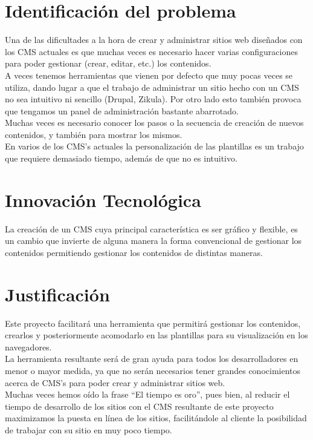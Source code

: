 \section{Identificaci\'on del problema}
Una de las dificultades a la hora de crear y administrar sitios web dise\~nados con los CMS actuales es que muchas veces es necesario hacer varias configuraciones para poder gestionar (crear, editar, etc.) los contenidos.\\
A veces tenemos herramientas que vienen por defecto que muy pocas veces se utiliza, dando lugar a que el trabajo de administrar un sitio hecho con un CMS no sea intuitivo ni sencillo (Drupal, Zikula). Por otro lado esto tambi\'en provoca que tengamos un panel de administraci\'on bastante abarrotado.\\
Muchas veces es necesario conocer los pasos o la secuencia de creaci\'on de nuevos contenidos, y tambi\'en para mostrar los mismos.\\
En varios de los CMS's actuales la personalizaci\'on de las plantillas es un trabajo que requiere demasiado tiempo, adem\'as de que no es intuitivo.\\

\section{Innovaci\'on Tecnol\'ogica}
La creaci\'on de un CMS cuya principal caracter\'istica es ser gr\'afico y flexible, es un cambio que invierte de alguna manera la forma convencional de gestionar los contenidos permitiendo gestionar los contenidos de distintas maneras.

\section{Justificaci\'on}
Este proyecto facilitar\'a una herramienta que permitir\'a gestionar los contenidos, crearlos y posteriormente acomodarlo en las plantillas para su visualizaci\'on en los navegadores.\\
La herramienta resultante ser\'a de gran ayuda para todos los desarrolladores en menor o mayor medida, ya que no ser\'an necesarios tener grandes conocimientos acerca de CMS's para poder crear y administrar sitios web.\\
Muchas veces hemos o\'ido la frase ``El tiempo es oro'', pues bien, al reducir el tiempo de desarrollo de los sitios con el CMS resultante de este proyecto maximizamos la puesta en l\'inea de los sitios, facilit\'andole al cliente la posibilidad de trabajar con su sitio en muy poco tiempo.

